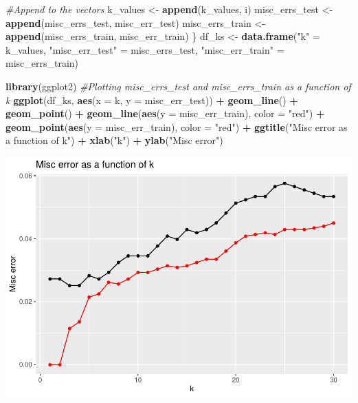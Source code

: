 \documentclass[
]{article}
\newenvironment{Shaded}{\begin{snugshade}}{\end{snugshade}}
\newcommand{\AttributeTok}[1]{\textcolor[rgb]{0.13,0.29,0.53}{#1}}
\newcommand{\CommentTok}[1]{\textcolor[rgb]{0.56,0.35,0.01}{\textit{#1}}}
\newcommand{\FunctionTok}[1]{\textcolor[rgb]{0.13,0.29,0.53}{\textbf{#1}}}
\newcommand{\NormalTok}[1]{#1}
\newcommand{\OtherTok}[1]{\textcolor[rgb]{0.56,0.35,0.01}{#1}}
\newcommand{\SpecialCharTok}[1]{\textcolor[rgb]{0.81,0.36,0.00}{\textbf{#1}}}
\newcommand{\StringTok}[1]{\textcolor[rgb]{0.31,0.60,0.02}{#1}}
\begin{document}
\begin{Shaded}
\begin{Highlighting}[]
  \CommentTok{\#Append to the vectors}
\NormalTok{  k\_values }\OtherTok{\textless{}{-}} \FunctionTok{append}\NormalTok{(k\_values, i)}
\NormalTok{  misc\_errs\_test }\OtherTok{\textless{}{-}} \FunctionTok{append}\NormalTok{(misc\_errs\_test, misc\_err\_test)}
\NormalTok{  misc\_errs\_train }\OtherTok{\textless{}{-}} \FunctionTok{append}\NormalTok{(misc\_errs\_train, misc\_err\_train)}
\NormalTok{\}}
\NormalTok{df\_ks }\OtherTok{\textless{}{-}} \FunctionTok{data.frame}\NormalTok{(}\StringTok{"k"} \OtherTok{=}\NormalTok{ k\_values, }\StringTok{"misc\_err\_test"} \OtherTok{=}\NormalTok{ misc\_errs\_test, }\StringTok{"misc\_err\_train"} \OtherTok{=}\NormalTok{ misc\_errs\_train)}
\end{Highlighting}
\end{Shaded}

\begin{Shaded}
\begin{Highlighting}[]
\FunctionTok{library}\NormalTok{(ggplot2)}
\CommentTok{\#Plotting misc\_errs\_test and misc\_errs\_train as a function of k}
\FunctionTok{ggplot}\NormalTok{(df\_ks, }\FunctionTok{aes}\NormalTok{(}\AttributeTok{x =}\NormalTok{ k, }\AttributeTok{y =}\NormalTok{ misc\_err\_test)) }\SpecialCharTok{+} \FunctionTok{geom\_line}\NormalTok{() }\SpecialCharTok{+} \FunctionTok{geom\_point}\NormalTok{() }\SpecialCharTok{+} \FunctionTok{geom\_line}\NormalTok{(}\FunctionTok{aes}\NormalTok{(}\AttributeTok{y =}\NormalTok{ misc\_err\_train), }\AttributeTok{color =} \StringTok{"red"}\NormalTok{) }\SpecialCharTok{+} \FunctionTok{geom\_point}\NormalTok{(}\FunctionTok{aes}\NormalTok{(}\AttributeTok{y =}\NormalTok{ misc\_err\_train), }\AttributeTok{color =} \StringTok{"red"}\NormalTok{) }\SpecialCharTok{+} \FunctionTok{ggtitle}\NormalTok{(}\StringTok{"Misc error as a function of k"}\NormalTok{) }\SpecialCharTok{+} \FunctionTok{xlab}\NormalTok{(}\StringTok{"k"}\NormalTok{) }\SpecialCharTok{+} \FunctionTok{ylab}\NormalTok{(}\StringTok{"Misc error"}\NormalTok{)}
\end{Highlighting}
\end{Shaded}

\includegraphics{lab1_report_files/figure-latex/1.4 plot-1.pdf}
\end{document}
